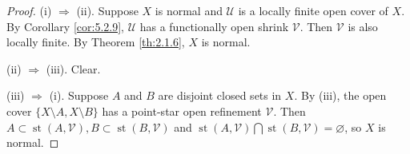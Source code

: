 \documentclass[jisng5i.tex]{subfiles}
\begin{document}
\begin{proof}
(i) $\Rightarrow$ (ii). Suppose $X$ is normal and $\mathscr{U}$ is a locally finite open cover of $X$. 
By Corollary \ref{cor:5.2.9}, $\mathscr{U}$ has a functionally open shrink $\mathscr{V}$. 
Then $\mathscr{V}$ is also locally finite. By Theorem \ref{th:2.1.6}, $X$ is normal.

(ii) $\Rightarrow$ (iii). Clear.

(iii) $\Rightarrow$ (i). Suppose $A$ and $B$ are disjoint closed sets in $X$. By (iii), 
the open cover $\{X\setminus A, X\setminus B\}$ has a point-star open refinement 
$\mathscr{V}$. Then 
$A \subset \operatorname{st}(A, \mathscr{V}),  B \subset \operatorname{st}(B, \mathscr{V})$ 
and 
$\operatorname{st}(A, \mathscr{V})\bigcap \operatorname{st}(B, \mathscr{V}) = \varnothing$, 
so $X$ is normal.
\end{proof}
\end{document}
